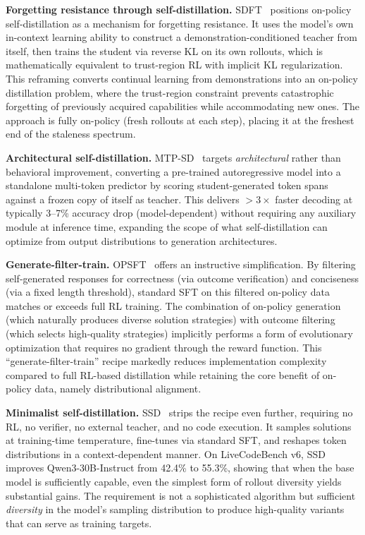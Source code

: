 \documentclass{article} %
\begin{document}
\textbf{Forgetting resistance through self-distillation.} SDFT~\citep{2601.19897} positions on-policy self-distillation as a mechanism for forgetting resistance. It uses the model's own in-context learning ability to construct a demonstration-conditioned teacher from itself, then trains the student via reverse KL on its own rollouts, which is mathematically equivalent to trust-region RL with implicit KL regularization. This reframing converts continual learning from demonstrations into an on-policy distillation problem, where the trust-region constraint prevents catastrophic forgetting of previously acquired capabilities while accommodating new ones. The approach is fully on-policy (fresh rollouts at each step), placing it at the freshest end of the staleness spectrum.

\textbf{Architectural self-distillation.} MTP-SD~\citep{2602.06019} targets \emph{architectural} rather than behavioral improvement, converting a pre-trained autoregressive model into a standalone multi-token predictor by scoring student-generated token spans against a frozen copy of itself as teacher. This delivers $>3\times$ faster decoding at typically 3--7\% accuracy drop (model-dependent) without requiring any auxiliary module at inference time, expanding the scope of what self-distillation can optimize from output distributions to generation architectures.

\textbf{Generate-filter-train.} OPSFT~\citep{2602.13407} offers an instructive simplification. By filtering self-generated responses for correctness (via outcome verification) and conciseness (via a fixed length threshold), standard SFT on this filtered on-policy data matches or exceeds full RL training. The combination of on-policy generation (which naturally produces diverse solution strategies) with outcome filtering (which selects high-quality strategies) implicitly performs a form of evolutionary optimization that requires no gradient through the reward function. This ``generate-filter-train'' recipe markedly reduces implementation complexity compared to full RL-based distillation while retaining the core benefit of on-policy data, namely distributional alignment.

\textbf{Minimalist self-distillation.} SSD~\citep{2604.01193} strips the recipe even further, requiring no RL, no verifier, no external teacher, and no code execution. It samples solutions at training-time temperature, fine-tunes via standard SFT, and reshapes token distributions in a context-dependent manner. On LiveCodeBench v6, SSD improves Qwen3-30B-Instruct from 42.4\% to 55.3\%, showing that when the base model is sufficiently capable, even the simplest form of rollout diversity yields substantial gains. The requirement is not a sophisticated algorithm but sufficient \emph{diversity} in the model's sampling distribution to produce high-quality variants that can serve as training targets.
\end{document}
